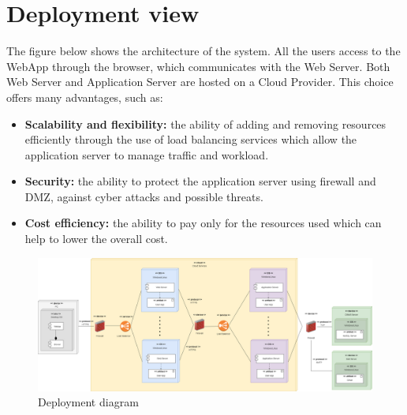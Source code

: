 \section{Deployment view}
The figure below shows the architecture of the system. All the users access to the WebApp through the browser, which communicates with
the Web Server. Both Web Server and Application Server are hosted on a Cloud Provider. This choice offers many
advantages, such as:

\begin{itemize}
    \item  \textbf{Scalability and flexibility: }the ability of adding and removing resources efficiently through 
    the use of load balancing services which allow the application server to manage traffic and workload. 
    \item   \textbf{Security: }the ability to protect the application server using firewall and DMZ, against cyber attacks and possible threats.
    \item   \textbf{Cost efficiency:} the ability to pay only for the resources used which can help to lower the overall cost. 
\end{itemize}

\begin{figure}[H]
    \centering
    \includegraphics[width=1\textwidth]{images/Deployment_diagram.png}
    \caption{Deployment diagram}
\end{figure}

